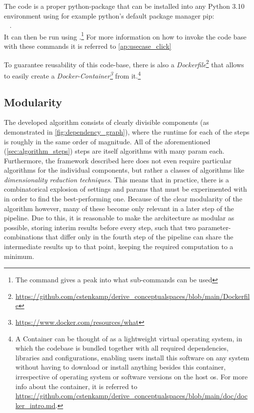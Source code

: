 The code is a proper python-package that can be installed into any Python 3.10 environment using for example python's default package manager pip:\\ ~ .\\ It can then be run using .\footnote{The command  gives a peak into what sub-commands can be used} For more information on how to invoke the code base with these commands it is referred to \autoref{ap:usecase_click}

To guarantee reusability of this code-base, there is also a \emph{Dockerfile}\footnote{{\url{https://github.com/cstenkamp/derive_conceptualspaces/blob/main/Dockerfile}}} that allows to easily create a \emph{Docker-Container\footnote{\url{https://www.docker.com/resources/what}}} from it.\footnote{A Container can be thought of as a lightweight virtual operating system, in which the codebase is bundled together with all required dependencies, libraries and configurations, enabling users install this software on any system without having to download or install anything besides this container, irrespective of operating system or software versions on the host \acrshort{os}. For more info about the container, it is referred to \url{https://github.com/cstenkamp/derive_conceptualspaces/blob/main/doc/docker_intro.md}.}

\subsection{Modularity}

The developed algorithm consists of clearly divisible components (as demonstrated in \autoref{fig:dependency_graph}), where the runtime for each of the steps is roughly in the same order of magnitude. All of the aforementioned (\autoref{sec:algorithm_steps}) steps are itself algorithms with many \gls{param} each. Furthermore, the framework described here does not even require particular algorithms for the individual components, but rather a classes of algorithms like \emph{dimensionality reduction techniques}. This means that in practice, there is a combinatorical explosion of settings and \glspl{param} that must be experimented with in order to find the best-performing one. Because of the clear modularity of the algorithm however, many of these become only relevant in a later step of the pipeline. Due to this, it is reasonable to make the architecture as modular as possible, storing interim results before every step, such that two parameter-combinations that differ only in \eg the fourth step of the pipeline can share the intermediate results up to that point, keeping the required computation to a minimum. 

